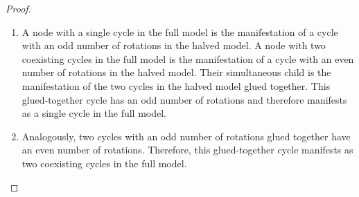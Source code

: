 \begin{proof}
	\begin{enumerate}
		\item A node with a single cycle in the full model is the manifestation of a cycle with an odd number of rotations in the halved model.
		      A node with two coexisting cycles in the full model is the manifestation of a cycle with an even number of rotations in the halved model.
		      Their simultaneous child is the manifestation of the two cycles in the halved model glued together.
		      This glued-together cycle has an odd number of rotations and therefore manifests as a single cycle in the full model.
		\item Analogously, two cycles with an odd number of rotations glued together have an even number of rotations.
		      Therefore, this glued-together cycle manifests as two coexisting cycles in the full model.
	\end{enumerate}
\end{proof}

